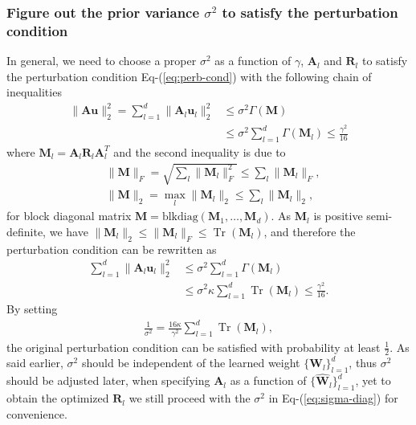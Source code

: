 \documentclass[journal]{IEEEtran} %
\def\eqref#1{Eq-(\ref{#1})}
\newcommand{\nn}{\nonumber}
\def\vu{{\bm{u}}}
\def\mA{{\bm{A}}}
\def\mM{{\bm{M}}}
\def\mR{{\bm{R}}}
\def\mW{{\bm{W}}}
\newcommand{\Norm}[1]{\|#1\|}
\DeclareMathOperator{\Tr}{Tr}
\begin{document}
\subsubsection{Figure out the prior variance $\sigma^2$ to satisfy the perturbation condition} In general, we need to choose a proper $\sigma^2$ as a function of $\gamma$, $\mA_l$ and $\mR_l$ to satisfy the perturbation condition \eqref{eq:perb-cond} with the following chain of inequalities
\begin{align}
\Norm{\mA \vu}_2^2 =  \sum_{l=1}^d \Norm{\mA_l \vu_l}_2^2 &\le \sigma^2  \Gamma(\mM) \nn \\ 
&\le \sigma^2  \sum_{l=1}^d \Gamma(\mM_l) \le \frac{\gamma^2}{16} 
\end{align}
where $\mM_l=\mA_l \mR_l \mA_l^T$ and the second inequality is due to 
\begin{align}
&\Norm{\mM}_F=\sqrt{\sum_l \Norm{\mM_l}_F^2} \le \sum_l \Norm{\mM_l}_F,\\
&\Norm{\mM}_2 = \max_l \Norm{\mM_l}_2 \le \sum_l \Norm{\mM_l}_2,
\end{align}
for block diagonal matrix $\mM=\mathrm{blkdiag}(\mM_1,\dots,\mM_d)$.
As $\mM_l$ is positive semi-definite, we have $\Norm{\mM_l}_2 \le \Norm{\mM_l}_F \le \Tr(\mM_l)$, and therefore the perturbation condition can be rewritten as
\begin{align}
   \sum_{l=1}^d \Norm{\mA_l \vu_l}_2^2 &\le \sigma^2  \sum_{l=1}^d \Gamma(\mM_l) \nn \\
   &\le \sigma^2 \kappa \sum_{l=1}^d \Tr(\mM_l) \le \frac{\gamma^2}{16}. \label{eq:chain-of-ineq}
\end{align}
%
By setting 
\begin{align} \label{eq:sigma-diag}
\frac{1}{\sigma^2} = 
\frac{16 \kappa}{\gamma^2} \sum_{l=1}^d \Tr({{\mM}}_l), 
\end{align}
the original perturbation condition can be satisfied with probability at least $\frac{1}{2}$. 
As said earlier, $\sigma^2$ should be independent of the learned weight $\{\mW_l\}_{l=1}^d$, thus 
% 
$\sigma^2$ should be adjusted later, when specifying $\mA_l$ as a function of $\{\hat{\mW}_l\}_{l=1}^d$, yet to obtain the optimized $\mR_l$ we still proceed with the $\sigma^2$ in \eqref{eq:sigma-diag} for convenience. 
\end{document}
